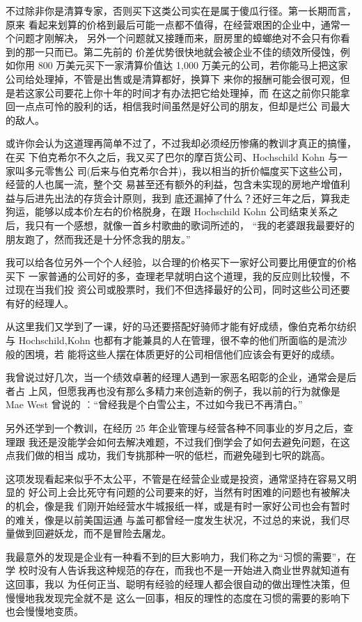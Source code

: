 \documentclass[UTF8,a4paper,zihao=-4,fontset = windows]{ctexart} %
\begin{document}
不过除非你是清算专家，否则买下这类公司实在是属于傻瓜行径。第一长期而言，原来
看起来划算的价格到最后可能一点都不值得，在经营艰困的企业中，通常一个问题才刚解决，
另外一个问题就又接踵而来，厨房里的蟑螂绝对不会只有你看到的那一只而已。第二先前的
价差优势很快地就会被企业不佳的绩效所侵蚀，例如你用 800 万美元买下一家清算价值达
1,000 万美元的公司，若你能马上把这家公司给处理掉，不管是出售或是清算都好，换算下
来你的报酬可能会很可观，但是若这家公司要花上你十年的时间才有办法把它给处理掉，而
在这之前你只能拿回一点点可怜的股利的话，相信我时间虽然是好公司的朋友，但却是烂公
司最大的敌人。

或许你会认为这道理再简单不过了，不过我却必须经历惨痛的教训才真正的搞懂，在买
下伯克希尔不久之后，我又买了巴尔的摩百货公司、Hochschild Kohn 与一家叫多元零售公
司(后来与伯克希尔合并)，我以相当的折价幅度买下这些公司，经营的人也属一流，整个交
易甚至还有额外的利益，包含未实现的房地产增值利益与后进先出法的存货会计原则，我到
底还漏掉了什么？还好三年之后，算我走狗运，能够以成本价左右的价格脱身，在跟
Hochschild Kohn 公司结束关系之后，我只有一个感想，就像一首乡村歌曲的歌词所述的，
“我的老婆跟我最要好的朋友跑了，然而我还是十分怀念我的朋友。”

我可以给各位另外一个个人经验，以合理的价格买下一家好公司要比用便宜的价格买下
一家普通的公司好的多，查理老早就明白这个道理，我的反应则比较慢，不过现在当我们投
资公司或股票时，我们不但选择最好的公司，同时这些公司还要有好的经理人。

从这里我们又学到了一课，好的马还要搭配好骑师才能有好成绩，像伯克希尔纺织与
Hochschild,Kohn 也都有才能兼具的人在管理，很不幸的他们所面临的是流沙般的困境，若
能将这些人摆在体质更好的公司相信他们应该会有更好的成绩。

我曾说过好几次，当一个绩效卓著的经理人遇到一家恶名昭彰的企业，通常会是后者占
上风，但愿我再也没有那么多精力来创造新的例子，我以前的行为就像是 Mae West 曾说的
︰“曾经我是个白雪公主，不过如今我已不再清白。”

另外还学到一个教训，在经历 25 年企业管理与经营各种不同事业的岁月之后，查理跟
我还是没能学会如何去解决难题，不过我们倒学会了如何去避免问题，在这点我们做的相当
成功，我们专挑那种一呎的低栏，而避免碰到七呎的跳高。

这项发现看起来似乎不太公平，不管是在经营企业或是投资，通常坚持在容易又明显的
好公司上会比死守有问题的公司要来的好，当然有时困难的问题也有被解决的机会，像是我
们刚开始经营水牛城报纸一样，或是有时一家好公司也会有暂时的难关，像是以前美国运通
与盖可都曾经一度发生状况，不过总的来说，我们尽量做到回避妖龙，而不是冒险去屠龙。

我最意外的发现是企业有一种看不到的巨大影响力，我们称之为“习惯的需要”，在学
校时没有人告诉我这种规范的存在，而我也不是一开始进入商业世界就知道有这回事，我以
为任何正当、聪明有经验的经理人都会很自动的做出理性决策，但慢慢地我发现完全就不是
这么一回事，相反的理性的态度在习惯的需要的影响下也会慢慢地变质。
\end{document}
